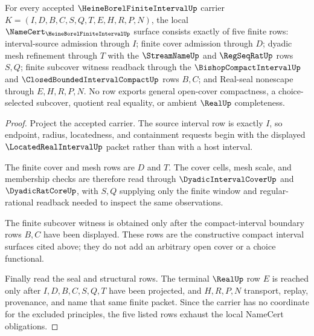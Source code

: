 \begin{theorem}
\label{thm:heine-borel-finite-interval-namecert-obligations}
For every accepted $\HeineBorelFiniteIntervalUp$ carrier $K=(I,D,B,C,S,Q,T,E,H,R,P,N)$, the local $\NameCert_{\HeineBorelFiniteIntervalUp}$ surface consists exactly of five finite rows: interval-source admission through $I$; finite cover admission through $D$; dyadic mesh refinement through $T$ with the $\StreamNameUp$ and $\RegSeqRatUp$ rows $S,Q$; finite subcover witness readback through the $\BishopCompactIntervalUp$ and $\ClosedBoundedIntervalCompactUp$ rows $B,C$; and Real-seal nonescape through $E,H,R,P,N$. No row exports general open-cover compactness, a choice-selected subcover, quotient real equality, or ambient $\RealUp$ completeness.
\end{theorem}
\begin{proof}
Project the accepted carrier. The source interval row is exactly $I$, so endpoint, radius, locatedness, and containment requests begin with the displayed $\LocatedRealIntervalUp$ packet rather than with a host interval.

The finite cover and mesh rows are $D$ and $T$. The cover cells, mesh scale, and membership checks are therefore read through $\DyadicIntervalCoverUp$ and $\DyadicRatCoreUp$, with $S,Q$ supplying only the finite window and regular-rational readback needed to inspect the same observations.

The finite subcover witness is obtained only after the compact-interval boundary rows $B,C$ have been displayed. These rows are the constructive compact interval surfaces cited above; they do not add an arbitrary open cover or a choice functional.

Finally read the seal and structural rows. The terminal $\RealUp$ row $E$ is reached only after $I,D,B,C,S,Q,T$ have been projected, and $H,R,P,N$ transport, replay, provenance, and name that same finite packet. Since the carrier has no coordinate for the excluded principles, the five listed rows exhaust the local NameCert obligations.
\end{proof}

